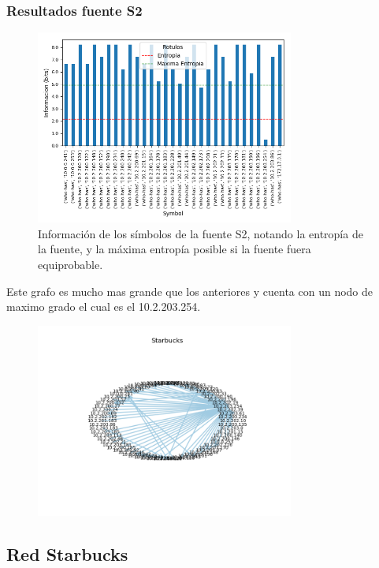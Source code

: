 \subsubsection*{Resultados fuente S2}

\begin{figure}[H]
  \centering
  \includegraphics[width=8.5cm]{figs/information_labo6_2018_04_18_S2_output.png}
  \caption{\normalfont Información de los símbolos de la fuente S2, notando la entropía de la fuente, y la máxima entropía posible si la fuente fuera equiprobable.}
\end{figure}

Este grafo es mucho mas grande que los anteriores y cuenta con un nodo de maximo grado el cual es el 10.2.203.254.

\begin{figure}[H]
 \centering
	\includegraphics[width=8.5cm]{figs/dc.png}
	\caption{}
	\label{fig:dc-grafo}
\end{figure}


\subsection*{Red Starbucks}
